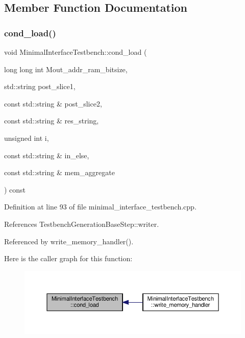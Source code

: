 \subsection{Member Function Documentation}
\mbox{\label{classMinimalInterfaceTestbench_a47fd2d6db6d166a24bebbe721856c5c1}} 
\subsubsection{\texorpdfstring{cond\+\_\+load()}{cond\_load()}}
{\footnotesize\ttfamily void Minimal\+Interface\+Testbench\+::cond\+\_\+load (\begin{DoxyParamCaption}\item[{long long int}]{Mout\+\_\+addr\+\_\+ram\+\_\+bitsize,  }\item[{std\+::string}]{post\+\_\+slice1,  }\item[{const std\+::string \&}]{post\+\_\+slice2,  }\item[{const std\+::string \&}]{res\+\_\+string,  }\item[{unsigned int}]{i,  }\item[{const std\+::string \&}]{in\+\_\+else,  }\item[{const std\+::string \&}]{mem\+\_\+aggregate }\end{DoxyParamCaption}) const\hspace{0.3cm}{\ttfamily [protected]}}



Definition at line 93 of file minimal\+\_\+interface\+\_\+testbench.\+cpp.



References Testbench\+Generation\+Base\+Step\+::writer.



Referenced by write\+\_\+memory\+\_\+handler().

Here is the caller graph for this function\+:
\nopagebreak
\begin{figure}[H]
\begin{center}
\leavevmode
\includegraphics[width=350pt]{d0/dba/classMinimalInterfaceTestbench_a47fd2d6db6d166a24bebbe721856c5c1_icgraph}
\end{center}
\end{figure}
\mbox{\label{classMinimalInterfaceTestbench_ade0c8242d6dadb2937939d9b31d12831}} 
